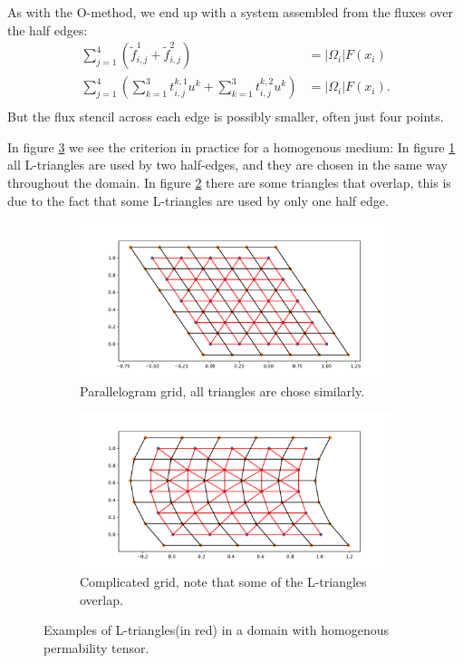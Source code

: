 \documentclass[../Main/main.tex]{subfiles}
\begin{document}
	\par
		As with the O-method, we end up with a system assembled from the fluxes over the half edges:
	\begin{equation}
		\begin{aligned}
			\sum_{j=1}^4 (\tilde{f}_{i,j}^1 + \tilde{f}_{i,j}^2) &= |\Omega_i|F(x_i) \\
			\sum_{j=1}^4 (\sum_{k=1}^3 t^{k,1}_{i,j}u^k + \sum_{k=1}^3 t^{k,2}_{i,j}u^k)&= |\Omega_i|F(x_i).\\
		\end{aligned}
	\end{equation}
	But the flux stencil across each edge is possibly smaller, often just four points.
	\par
	In figure \ref{fig:L-triangles} we see the criterion in practice for a homogenous medium: In figure \ref{fig:paralellogram-L} all L-triangles are used by two half-edges, and they are chosen in the same way throughout the domain. In figure \ref{fig:complicated-L} there are some triangles that overlap, this is due to the fact that some L-triangles are used by only one half edge.
	\begin{figure}[H]
		\centering
		\begin{subfigure}[b]{0.8\textwidth}
			\centering
			\includegraphics[width=\textwidth]{L-triangles_paralellogram.pdf}
			\caption{Parallelogram grid, all triangles are chose similarly.}
			\label{fig:paralellogram-L}
		\end{subfigure}
		\hfill
		\begin{subfigure}[b]{0.8\textwidth}
			\centering
			\includegraphics[width=\textwidth]{L-triangles_complex.pdf}
			\caption{Complicated grid, note that some of the L-triangles overlap.}
			\label{fig:complicated-L}
		\end{subfigure}
		\caption{Examples of L-triangles(in red) in a domain with homogenous permability tensor.}
		\label{fig:L-triangles}
	\end{figure}
\end{document}
